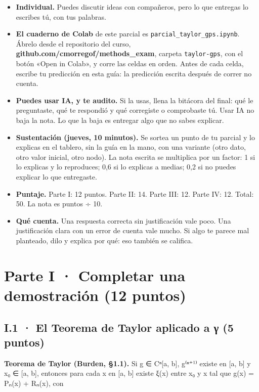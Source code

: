 \begin{itemize}
\tightlist
\item
  \textbf{Individual.} Puedes discutir ideas con compañeros, pero lo que entregas lo escribes tú, con tus palabras.
\item
  \textbf{El cuaderno de Colab} de este parcial es \texttt{parcial\_taylor\_gps.ipynb}. Ábrelo desde el repositorio del curso, \textbf{github.com/cmorregof/methods\_exam}, carpeta \texttt{taylor-gps}, con el botón «Open in Colab», y corre las celdas en orden. Antes de cada celda, escribe tu predicción en esta guía: la predicción escrita después de correr no cuenta.
\item
  \textbf{Puedes usar IA, y te audito.} Si la usas, llena la bitácora del final: qué le preguntaste, qué te respondió y qué corregiste o comprobaste tú. Usar IA no baja la nota. Lo que la baja es entregar algo que no sabes explicar.
\item
  \textbf{Sustentación (jueves, 10 minutos).} Se sortea un punto de tu parcial y lo explicas en el tablero, sin la guía en la mano, con una variante (otro dato, otro valor inicial, otro nodo). La nota escrita se multiplica por un factor: 1 si lo explicas y lo reproduces; 0,6 si lo explicas a medias; 0,2 si no puedes explicar lo que entregaste.
\item
  \textbf{Puntaje.} Parte I: 12 puntos. Parte II: 14. Parte III: 12. Parte IV: 12. Total: 50. La nota es puntos ÷ 10.
\item
  \textbf{Qué cuenta.} Una respuesta correcta sin justificación vale poco. Una justificación clara con un error de cuenta vale mucho. Si algo te parece mal planteado, dilo y explica por qué: eso también se califica.
\end{itemize}

\section{Parte I · Completar una demostración (12 puntos)}

\subsection{I.1 · El Teorema de Taylor aplicado a γ (5 puntos)}

\textbf{Teorema de Taylor (Burden, §1.1).} Si g ∈ Cⁿ{[}a, b{]}, g⁽ⁿ⁺¹⁾ existe en {[}a, b{]} y x₀ ∈ {[}a, b{]}, entonces para cada x en {[}a, b{]} existe ξ(x) entre x₀ y x tal que g(x) = Pₙ(x) + Rₙ(x), con

